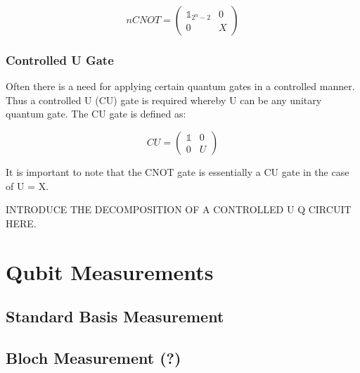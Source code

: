 \begin{equation}
nCNOT = \begin{pmatrix}
 \mathbb{1}_{2^n-2} & 0 \\ 
 0 & X
 \end{pmatrix}
\end{equation}

\subsubsection{Controlled U Gate}
\label{subsubsubsec:controlledugate}

Often there is a need for applying certain quantum gates in a controlled manner. Thus a controlled U (CU) gate is required whereby U can be any unitary quantum gate. The CU gate is defined as:

\begin{equation}
CU = \begin{pmatrix}
 \mathbb{1} & 0 \\ 
 0 & U
 \end{pmatrix}
\end{equation}

It is important to note that the CNOT gate is essentially a CU gate in the case of U = X. 

INTRODUCE THE DECOMPOSITION OF A CONTROLLED U Q CIRCUIT HERE.


\section{Qubit Measurements}
\label{subsec:qubitmeasurements}

\subsection{Standard Basis Measurement}
\label{subsubsec:standardbasismeasurement}

\subsection{Bloch Measurement (?)}
\label{subsubsec:blochmeasurement}



